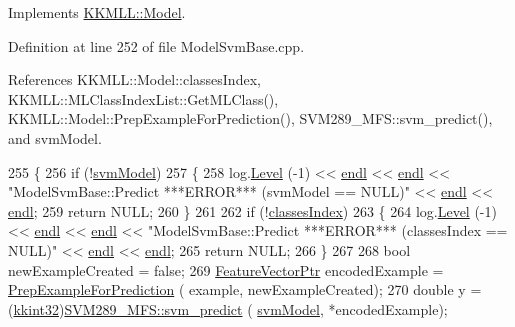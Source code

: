 Implements \hyperlink{class_k_k_m_l_l_1_1_model_a58ced625000ae9bffffb339e3c73d259}{K\+K\+M\+L\+L\+::\+Model}.



Definition at line 252 of file Model\+Svm\+Base.\+cpp.



References K\+K\+M\+L\+L\+::\+Model\+::classes\+Index, K\+K\+M\+L\+L\+::\+M\+L\+Class\+Index\+List\+::\+Get\+M\+L\+Class(), K\+K\+M\+L\+L\+::\+Model\+::\+Prep\+Example\+For\+Prediction(), S\+V\+M289\+\_\+\+M\+F\+S\+::svm\+\_\+predict(), and svm\+Model.


\begin{DoxyCode}
255 \{
256   \textcolor{keywordflow}{if}  (!\hyperlink{class_k_k_m_l_l_1_1_model_svm_base_a8f6ed793dfaa080ddea8e1776d2ee755}{svmModel})
257   \{
258     log.\hyperlink{class_k_k_b_1_1_run_log_a32cf761d7f2e747465fd80533fdbb659}{Level} (-1) << \hyperlink{namespace_k_k_b_ad1f50f65af6adc8fa9e6f62d007818a8}{endl} << \hyperlink{namespace_k_k_b_ad1f50f65af6adc8fa9e6f62d007818a8}{endl} << \textcolor{stringliteral}{"ModelSvmBase::Predict   ***ERROR***      (svmModel ==
       NULL)"} << \hyperlink{namespace_k_k_b_ad1f50f65af6adc8fa9e6f62d007818a8}{endl} << \hyperlink{namespace_k_k_b_ad1f50f65af6adc8fa9e6f62d007818a8}{endl};
259     \textcolor{keywordflow}{return} NULL;
260   \}
261 
262   \textcolor{keywordflow}{if}  (!\hyperlink{class_k_k_m_l_l_1_1_model_adbb9475e16bb2c3eef52170485e3018e}{classesIndex})
263   \{
264     log.\hyperlink{class_k_k_b_1_1_run_log_a32cf761d7f2e747465fd80533fdbb659}{Level} (-1) << \hyperlink{namespace_k_k_b_ad1f50f65af6adc8fa9e6f62d007818a8}{endl} << \hyperlink{namespace_k_k_b_ad1f50f65af6adc8fa9e6f62d007818a8}{endl} << \textcolor{stringliteral}{"ModelSvmBase::Predict   ***ERROR***      (classesIndex
       == NULL)"} << \hyperlink{namespace_k_k_b_ad1f50f65af6adc8fa9e6f62d007818a8}{endl} << \hyperlink{namespace_k_k_b_ad1f50f65af6adc8fa9e6f62d007818a8}{endl};
265     \textcolor{keywordflow}{return} NULL;
266   \}
267 
268   \textcolor{keywordtype}{bool}  newExampleCreated = \textcolor{keyword}{false};
269   \hyperlink{class_k_k_m_l_l_1_1_feature_vector}{FeatureVectorPtr}  encodedExample = \hyperlink{class_k_k_m_l_l_1_1_model_a31b972adfb64769b3ae966debec824fd}{PrepExampleForPrediction} (
      example, newExampleCreated);
270   \textcolor{keywordtype}{double}  y = (\hyperlink{namespace_k_k_b_a8fa4952cc84fda1de4bec1fbdd8d5b1b}{kkint32})\hyperlink{namespace_s_v_m289___m_f_s_a136a98397b8b552cb5ddcc8691cb7dd1}{SVM289\_MFS::svm\_predict}  (
      \hyperlink{class_k_k_m_l_l_1_1_model_svm_base_a8f6ed793dfaa080ddea8e1776d2ee755}{svmModel}, *encodedExample);

\end{DoxyCode}
